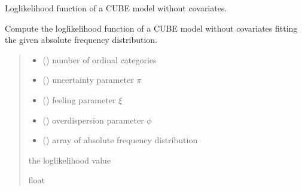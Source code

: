 \documentclass[letterpaper,10pt,english]{sphinxmanual}
\begin{document}
\begin{fulllineitems}
\label{\detokenize{cubmods:cubmods.cube.loglik}}
\pysigstartsignatures
{}
\pysigstopsignatures
\sphinxAtStartPar
Log\sphinxhyphen{}likelihood function of a CUBE model without covariates.

\sphinxAtStartPar
Compute the log\sphinxhyphen{}likelihood function of a CUBE model without covariates fitting 
the given absolute frequency distribution.
\begin{quote}\begin{description}
\begin{itemize}
\item {} 
\sphinxAtStartPar
{} () \textendash{} number of ordinal categories

\item {} 
\sphinxAtStartPar
{} () \textendash{} uncertainty parameter \(\pi\)

\item {} 
\sphinxAtStartPar
{} () \textendash{} feeling parameter \(\xi\)

\item {} 
\sphinxAtStartPar
{} () \textendash{} overdispersion parameter \(\phi\)

\item {} 
\sphinxAtStartPar
{} () \textendash{} array of absolute frequency distribution

\end{itemize}

\sphinxAtStartPar
the log\sphinxhyphen{}likelihood value

\sphinxAtStartPar
float

\end{description}\end{quote}

\end{fulllineitems}
\end{document}
